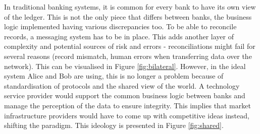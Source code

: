 \documentclass[12pt,twoside]{article}
\begin{document}
In traditional banking systems, it is common for every bank to have its own view of the ledger. This is not the only piece that differs between banks, the business logic implemented having various discrepancies too. To be able to reconcile records, a messaging system has to be in place. This adds another layer of complexity and potential sources of risk and errors - reconciliations might fail for several reasons (record mismatch, human errors when transferring data over the network). This can be visualised in Figure \ref{fig:bilateral}. However, in the ideal system Alice and Bob are using, this is no longer a problem because of standardisation of protocols and the shared view of the world. A technology service provider would support the common business logic between banks and manage the perception of the data to ensure integrity. This implies that market infrastructure providers would have to come up with competitive ideas instead, shifting the paradigm. This ideology is presented in Figure \ref{fig:shared}.
\end{document}
